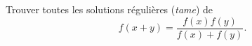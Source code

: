 Trouver toutes les solutions régulières (\emph{tame}) de
\[ f(x + y) = \frac{f(x)f(y)}{f(x) + f(y)}. \]
